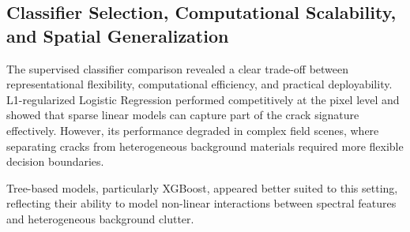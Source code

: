 \subsection{Classifier Selection, Computational Scalability, and Spatial Generalization}
\noindent
The supervised classifier comparison revealed a clear trade-off between representational flexibility, computational efficiency, and practical deployability. L1-regularized Logistic Regression performed competitively at the pixel level and showed that sparse linear models can capture part of the crack signature effectively. However, its performance degraded in complex field scenes, where separating cracks from heterogeneous background materials required more flexible decision boundaries.

\medskip\noindent
Tree-based models, particularly XGBoost, appeared better suited to this setting, reflecting their ability to model non-linear interactions between spectral features and heterogeneous background clutter.


